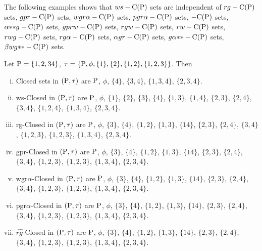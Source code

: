 \begin{rem}\label{rem2.2.14}
The following examples shows that $ws-\mathrm{C}(\mathrm{P})$ sets are independent of $rg-\mathrm{C}(\mathrm{P})$ sets, $gpr-\mathrm{C}(\mathrm{P})$ sets, $wgr\alpha-\mathrm{C}(\mathrm{P})$ sets, $pgr\alpha-\mathrm{C}(\mathrm{P})$ sets, $-\mathrm{C}(\mathrm{P})$ sets, $\alpha {*}{*}g-\mathrm{C}(\mathrm{P})$ sets, $gprw-\mathrm{C}(\mathrm{P})$ sets, $rgw-\mathrm{C}(\mathrm{P})$ sets, $rw-\mathrm{C}(\mathrm{P})$ sets, $rwg-\mathrm{C}(\mathrm{P})$ sets, $rg\alpha-\mathrm{C}(\mathrm{P})$ sets, $\alpha gr-\mathrm{C}(\mathrm{P})$ sets, $g\alpha {*}{*}-\mathrm{C}(\mathrm{P})$ sets, $\beta wg{*}{*}-\mathrm{C}(\mathrm{P})$ sets.
\end{rem}

\begin{exm}\label{exm2.2.15}
Let $\mathrm{P} = \{1, 2, 3 4\}$, $\tau = \{\mathrm{P},\phi, \{1\}, \{2\}, \{1, 2\}, \{1, 2, 3\}\}$. Then 
\begin{enumerate}[(i)]
\item Closed sets in $(\mathrm{P}, \tau)$ are $\mathrm{P}$, $\phi$, $\{4\}$, $\{3, 4\}$, $\{1, 3, 4\}$, $\{2, 3, 4\}$.

\item ws-Closed in $(\mathrm{P}, \tau)$ are $\mathrm{P}$, $\phi$, $\{1\}$, $\{2\}$, $\{3\}$, $\{4\}$, $\{1, 3\}$, $\{1, 4\}$, $\{2, 3\}$, $\{2, 4\}$, $\{3, 4\}$, $\{1, 2, 4\}$, $\{1, 3, 4\}$, $\{2, 3, 4\}$.

\item rg-Closed in $(\mathrm{P}, \tau)$ are $\mathrm{P}$, $\phi$, $\{3\}$, $\{4\}$, $\{1, 2\}$, $\{1, 3\}$, $\{1 4\}$, $\{2, 3\}$, $\{2, 4\}$, $\{3, 4\}$, $\{1, 2, 3\}$, $\{1, 2, 3\}$, $\{1, 3, 4\}$, $\{2, 3, 4\}$.

\item gpr-Closed in $(\mathrm{P}, \tau)$ are $\mathrm{P}$, $\phi$, $\{3\}$, $\{4\}$, $\{1, 2\}$, $\{1, 3\}$, $\{1 4\}$, $\{2, 3\}$, $\{2, 4\}$, $\{3, 4\}$, $\{1, 2, 3\}$, $\{1, 2, 3\}$, $\{1, 3, 4\}$, $\{2, 3, 4\}$.

\item wgr$\alpha$-Closed in $(\mathrm{P}, \tau)$ are $\mathrm{P}$, $\phi$, $\{3\}$, $\{4\}$, $\{1, 2\}$, $\{1, 3\}$, $\{1 4\}$, $\{2, 3\}$, $\{2, 4\}$, $\{3, 4\}$, $\{1, 2, 3\}$, $\{1, 2, 3\}$, $\{1, 3, 4\}$, $\{2, 3, 4\}$.

\item pgr$\alpha$-Closed in $(\mathrm{P}, \tau)$ are $\mathrm{P}$, $\phi$, $\{3\}$, $\{4\}$, $\{1, 2\}$, $\{1, 3\}$, $\{1 4\}$, $\{2, 3\}$, $\{2, 4\}$, $\{3, 4\}$, $\{1, 2, 3\}$, $\{1, 2, 3\}$, $\{1, 3, 4\}$, $\{2, 3, 4\}$.

\item $\widehat{rg}$-Closed in $(\mathrm{P}, \tau)$ are $\mathrm{P}$, $\phi$, $\{3\}$, $\{4\}$, $\{1, 2\}$, $\{1, 3\}$, $\{1 4\}$, $\{2, 3\}$, $\{2, 4\}$, $\{3, 4\}$, $\{1, 2, 3\}$, $\{1, 2, 3\}$, $\{1, 3, 4\}$, $\{2, 3, 4\}$.


\end{enumerate}
\end{exm}
